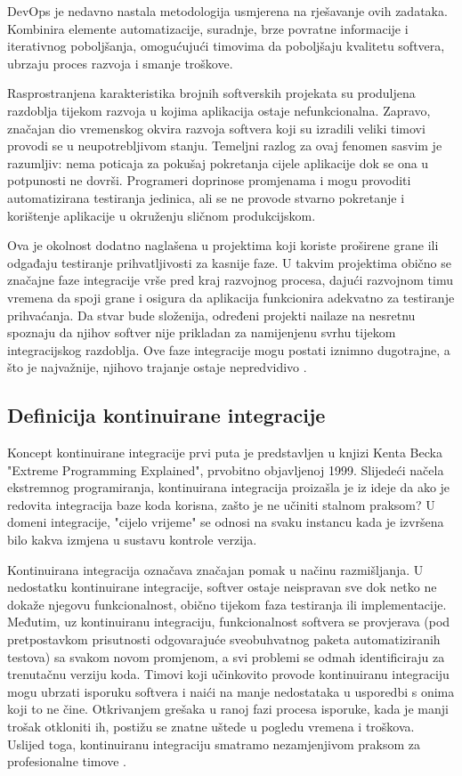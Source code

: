 \documentclass[a4paper,12pt,oneside]{article}
\begin{document}
DevOps je nedavno nastala metodologija usmjerena na rješavanje ovih zadataka. Kombinira elemente automatizacije, suradnje, brze povratne informacije i iterativnog poboljšanja, omogućujući timovima da poboljšaju kvalitetu softvera, ubrzaju proces razvoja i smanje troškove\cite{cowell2023automating}. 
 
Rasprostranjena karakteristika brojnih softverskih projekata su produljena razdoblja tijekom razvoja u kojima aplikacija ostaje nefunkcionalna. Zapravo, značajan dio vremenskog okvira razvoja softvera koji su izradili veliki timovi provodi se u neupotrebljivom stanju. Temeljni razlog za ovaj fenomen sasvim je razumljiv: nema poticaja za pokušaj pokretanja cijele aplikacije dok se ona u potpunosti ne dovrši. Programeri doprinose promjenama i mogu provoditi automatizirana testiranja jedinica, ali se ne provode stvarno pokretanje i korištenje aplikacije u okruženju sličnom produkcijskom.

Ova je okolnost dodatno naglašena u projektima koji koriste proširene grane ili odgađaju testiranje prihvatljivosti za kasnije faze. U takvim projektima obično se značajne faze integracije vrše pred kraj razvojnog procesa, dajući razvojnom timu vremena da spoji grane i osigura da aplikacija funkcionira adekvatno za testiranje prihvaćanja. Da stvar bude složenija, određeni projekti nailaze na nesretnu spoznaju da njihov softver nije prikladan za namijenjenu svrhu tijekom integracijskog razdoblja. Ove faze integracije mogu postati iznimno dugotrajne, a što je najvažnije, njihovo trajanje ostaje nepredvidivo \cite{humble2010continuous}.

\subsection{Definicija kontinuirane integracije}
Koncept kontinuirane integracije prvi puta je predstavljen u knjizi Kenta Becka "Extreme Programming Explained", prvobitno objavljenoj 1999. Slijedeći načela ekstremnog programiranja, kontinuirana integracija proizašla je iz ideje da ako je redovita integracija baze koda korisna, zašto je ne učiniti stalnom praksom? U domeni integracije, "cijelo vrijeme" se odnosi na svaku instancu kada je izvršena bilo kakva izmjena u sustavu kontrole verzija.

Kontinuirana integracija označava značajan pomak u načinu razmišljanja. U nedostatku kontinuirane integracije, softver ostaje neispravan sve dok netko ne dokaže njegovu funkcionalnost, obično tijekom faza testiranja ili implementacije. Međutim, uz kontinuiranu integraciju, funkcionalnost softvera se provjerava (pod pretpostavkom prisutnosti odgovarajuće sveobuhvatnog paketa automatiziranih testova) sa svakom novom promjenom, a svi problemi se odmah identificiraju za trenutačnu verziju koda. Timovi koji učinkovito provode kontinuiranu integraciju mogu ubrzati isporuku softvera i naići na manje nedostataka u usporedbi s onima koji to ne čine. Otkrivanjem grešaka u ranoj fazi procesa isporuke, kada je manji trošak otkloniti ih, postižu se znatne uštede u pogledu vremena i troškova. Uslijed toga, kontinuiranu integraciju smatramo nezamjenjivom praksom za profesionalne timove \cite{humble2010continuous}.
\end{document}
